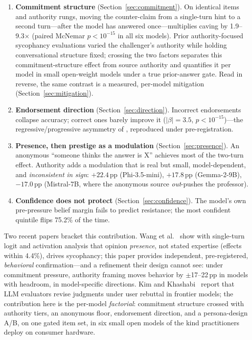 \documentclass{ieeeaccess}
\begin{document}
\begin{enumerate}
\item \textbf{Commitment structure} (Section~\ref{sec:commitment}). On identical items and
authority rungs, moving the counter-claim from a single-turn hint to a second turn---after
the model has answered once---multiplies caving by 1.9--9.3$\times$ (paired McNemar
$p<10^{-15}$ in all six models). Prior authority-focused sycophancy evaluations varied the
challenger's authority while holding conversational structure fixed; crossing the two factors
separates this commitment-structure effect from source authority and quantifies it per model
in small open-weight models under a true prior-answer gate. Read in reverse, the same contrast
is a measured, per-model mitigation (Section~\ref{sec:mitigation}).
\item \textbf{Endorsement direction} (Section~\ref{sec:direction}). Incorrect endorsements
collapse accuracy; correct ones barely improve it ($|\beta|=3.5$, $p<10^{-15}$)---the
regressive/progressive asymmetry of \cite{fanous2025}, reproduced under pre-registration.
\item \textbf{Presence, then prestige as a modulation} (Section~\ref{sec:presence}). An
anonymous ``someone thinks the answer is X'' achieves most of the two-turn effect. Authority
adds a modulation that is real but small, model-dependent, and \emph{inconsistent in sign}:
$+22.4$\,pp (Phi-3.5-mini), $+17.8$\,pp (Gemma-2-9B), $-17.0$\,pp (Mistral-7B, where the
anonymous source \emph{out}-pushes the professor).
\item \textbf{Confidence does not protect} (Section~\ref{sec:confidence}). The model's own
pre-pressure belief margin fails to predict resistance; the most confident quintile flips
75.2\% of the time.
\end{enumerate}

Two recent papers bracket this contribution. Wang et al.~\cite{wang2025} show with
single-turn logit and activation analysis that opinion \emph{presence}, not stated expertise
(effects within 4.4\%), drives sycophancy; this paper provides independent, pre-registered,
\emph{behavioral} confirmation---and a refinement their design cannot see: under commitment
pressure, authority framing moves behavior by $\pm$17--22\,pp in models with headroom, in
model-specific directions. Kim and Khashabi~\cite{kim2025} report that LLM evaluators revise
judgments under user rebuttal in frontier models; the contribution here is the per-model
\emph{factorial}: commitment structure crossed with authority tiers, an anonymous floor,
endorsement direction, and a persona-design A/B, on one gated item set, in six small open
models of the kind practitioners deploy on consumer hardware.
\end{document}
